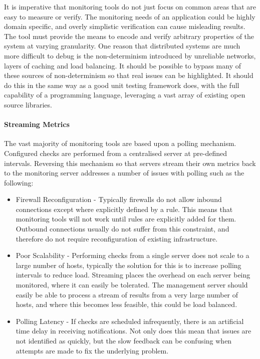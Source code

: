 \documentclass{cshonours}
\begin{document}
It is imperative that monitoring tools do not just focus on common areas that are easy to measure or verify. The monitoring needs of an application could be highly domain specific, and overly simplistic verification can cause misleading results. The tool must provide the means to encode and verify arbitrary properties of the system at varying granularity. One reason that distributed systems are much more difficult to debug is the non-determinism introduced by unreliable networks, layers of caching and load balancing. It should be possible to bypass many of these sources of non-determinism so that real issues can be highlighted. It should do this in the same way as a good unit testing framework does, with the full capability of a programming language, leveraging a vast array of existing open source libraries.

\paragraph{Streaming Metrics} The vast majority of monitoring tools are based upon a polling mechanism. Configured checks are performed from a centralised server at pre-defined intervals. Reversing this mechanism so that servers stream their own metrics back to the monitoring server addresses a number of issues with polling such as the following:

\begin{itemize}
  \item Firewall Reconfiguration - Typically firewalls do not allow inbound connections except where explicitly defined by a rule. This means that monitoring tools will not work until rules are explicitly added for them. Outbound connections usually do not suffer from this constraint, and therefore do not require reconfiguration of existing infrastructure.
  \item Poor Scalability - Performing checks from a single server does not scale to a large number of hosts, typically the solution for this is to increase polling intervals to reduce load. Streaming places the overhead on each server being monitored, where it can easily be tolerated. The management server should easily be able to process a stream of results from a very large number of hosts, and where this becomes less feasible, this could be load balanced.
  \item Polling Latency - If checks are scheduled infrequently, there is an artificial time delay in receiving notifications. Not only does this mean that issues are not identified as quickly, but the slow feedback can be confusing when attempts are made to fix the underlying problem.
\end{itemize}
\end{document}
